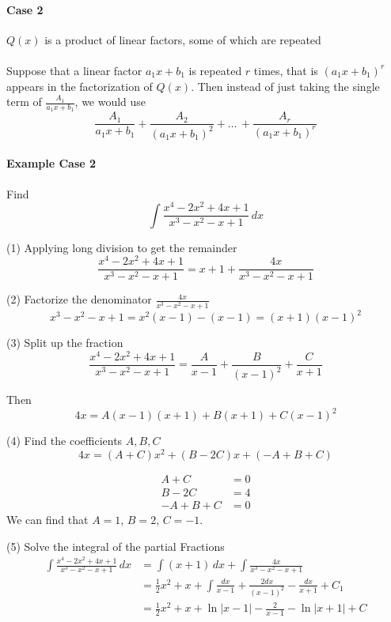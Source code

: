 \documentclass[12pt]{article}
\begin{document}
\paragraph{Case 2} $Q(x)$ is a product of linear factors, some of which are repeated \\ \\
Suppose that a linear factor $a_1x + b_1$ is repeated $r$ times, that is $(a_1x + b_1)^r$ appears in the factorization of $Q(x)$. Then instead of just taking the single term of $\frac{A_1}{a_1x + b_1}$, we would use
\[
    \frac{A_1}{a_1x + b_1} + \frac{A_2}{(a_1x + b_1)^2} + \dots\, + \frac{A_r}{(a_1x + b_1)^r} 
\]

\paragraph{Example Case 2} Find
\[
    \int \frac{x^4 - 2x^2 + 4x + 1}{x^3 - x^2 - x + 1} \, dx 
\]

(1) Applying long division to get the remainder 
\[
    \frac{x^4 - 2x^2 + 4x + 1}{x^3 - x^2 - x + 1} = x + 1 + \frac{4x}{x^3 - x^2 - x + 1} 
\]

(2) Factorize the denominator $\frac{4x}{x^3 - x^2 - x + 1}$
\[
    x^3 - x^2 - x + 1 = x^2(x - 1) - (x - 1) = (x + 1)(x -1)^2
\]

(3) Split up the fraction 
\[
    \frac{x^4 - 2x^2 + 4x + 1}{x^3 - x^2 - x + 1} = \frac{A}{x - 1} + \frac{B}{(x - 1)^2} + \frac{C}{x + 1}
\]

Then
\[
    4x = A(x - 1)(x + 1) + B(x + 1) + C(x - 1)^2
\]

(4) Find the coefficients $A, B, C$
\[
    4x = (A + C)x^2 + (B - 2C)x + ( - A + B + C)
\]

\begin{align*} 
     A + C &= 0 \\
     B - 2C &= 4 \\
     - A + B + C &= 0 
\end{align*}
We can find that $A = 1$, $B = 2$, $C = -1$.

(5) Solve the integral of the partial Fractions
\begin{align*} 
    \int \frac{x^4 - 2x^2 + 4x + 1}{x^3 - x^2 - x + 1} \, dx &= \int (x + 1) \, dx + \int \frac{4x}{x^3 - x^2 - x + 1} \\ 
    &= \frac{1}{2}x^2 + x + \int \frac{dx}{x - 1} + \frac{2dx}{(x - 1)^2} - \frac{dx}{x + 1} + C_1 \\
    &= \frac{1}{2}x^2 + x + \ln |x - 1| - \frac{2}{x - 1} - \ln|x + 1| + C
\end{align*}
\end{document}
